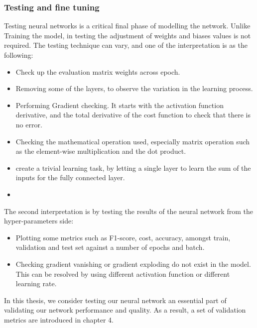 \subsubsection{Testing and fine tuning}
\hspace{5mm} Testing neural networks is a critical final phase of modelling the network. Unlike Training the model, in testing the adjustment of weights and biases values is not required. The testing technique can vary, and one of the interpretation is as the following:
\begin{itemize}
    \item Check up the evaluation matrix weights across epoch.
    \item Removing some of the layers, to observe the variation in the learning process.
    \item Performing Gradient checking. It starts with the activation function derivative, and the total derivative of the cost function to check that there is no error.
    \item Checking the mathematical operation used, especially matrix operation such as the element-wise multiplication and the dot product.
    \item create a trivial learning task, by letting a single layer to learn the sum of the inputs for the fully connected layer. 
    \item 
\end{itemize}
\hspace{5mm} The second interpretation is by testing the results of the neural network from the hyper-parameters side:
\begin{itemize}
    \item Plotting some metrics such as F1-score, cost, accuracy, amongst train, validation and test set against a number of epochs and batch.
    \item Checking gradient vanishing or gradient exploding do not exist in the model. This can be resolved by using different activation function or different learning rate.
\end{itemize}
\hspace{5mm} In this thesis, we consider testing our neural network an essential part of validating our network performance and quality. As a result, a set of validation metrics are introduced in chapter 4. 
